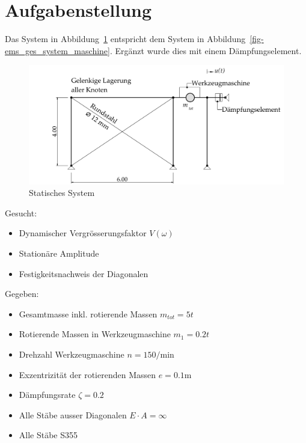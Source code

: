 \documentclass[
  letterpaper,
  DIV=11]{scrreprt}
\providecommand{\tightlist}{%
  \setlength{\itemsep}{0pt}\setlength{\parskip}{0pt}}\usepackage{longtable,booktabs,array}
\begin{document}
\hypertarget{aufgabenstellung-7}{%
\section{Aufgabenstellung}\label{aufgabenstellung-7}}

Das System in Abbildung~\ref{fig-ems_dampf_system} entspricht dem System
in Abbildung~\ref{fig-ems_ges_system_maschine}. Ergänzt wurde dies mit
einem Dämpfungselement.

\begin{figure}[H]

{\centering \includegraphics{index_files/mediabag/bilder/aufgabe_ems_gedampft_system.pdf}

}

\caption{\label{fig-ems_dampf_system}Statisches System}

\end{figure}

Gesucht:

\begin{itemize}
\tightlist
\item
  Dynamischer Vergrösserungsfaktor \(V(\omega)\)
\item
  Stationäre Amplitude
\item
  Festigkeitsnachweis der Diagonalen
\end{itemize}

Gegeben:

\begin{itemize}
\tightlist
\item
  Gesamtmasse inkl. rotierende Massen \(m_{tot} = 5t\)
\item
  Rotierende Massen in Werkzeugmaschine \(m_1 = 0.2 t\)
\item
  Drehzahl Werkzeugmaschine \(n = 150/\text{min}\)
\item
  Exzentrizität der rotierenden Massen \(e =0.1\text{m}\)
\item
  Dämpfungsrate \(\zeta = 0.2\)
\item
  Alle Stäbe ausser Diagonalen \(E\cdot A = \infty\)
\item
  Alle Stäbe S355
\end{itemize}
\end{document}
